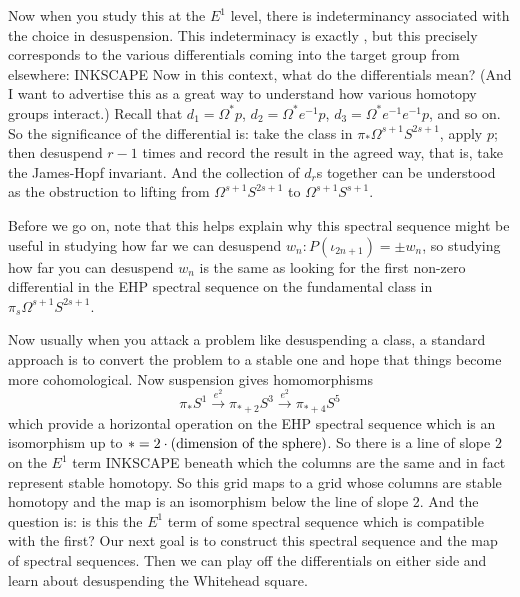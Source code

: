 \documentclass{article}
\newcommand{\BoxedNote}[1]{
\begin{center}\fbox{\begin{minipage}{.75\textwidth}
#1
\end{minipage}}
\end{center}
}
\newcommand{\Loops}{\Omega}
\begin{document}
Now when you study this at the $E^1$ level, there is indeterminancy associated with the choice in desuspension. This indeterminacy is exactly , but this precisely corresponds to the various differentials coming into the target group from elsewhere: INKSCAPE  Now in this context, what do the differentials mean?  (And I want to advertise this as a great way to understand how various homotopy groups interact.)  Recall that $d_1 = \Loops^* p$, $d_2 = \Loops^* e^{-1} p$, $d_3 = \Loops^* e^{-1} e^{-1} p$, and so on.  So the significance of the differential is: take the class in $\pi_* \Loops^{s+1} S^{2s+1}$, apply $p$; then desuspend $r-1$ times and record the result in the agreed way, that is, take the James-Hopf invariant.  And the collection of $d_r$s together can be understood as the obstruction to lifting from $\Loops^{s+1} S^{2s+1}$ to $\Loops^{s+1} S^{s+1}$.

Before we go on, note that this helps explain why this spectral sequence might be useful in studying how far we can desuspend $w_n: P(\iota_{2n+1}) = \pm w_n$, so studying how far you can desuspend $w_n$ is the same as looking for the first non-zero differential in the EHP spectral sequence on the fundamental class in $\pi_s \Loops^{s+1} S^{2s+1}$.

Now usually when you attack a problem like desuspending a class, a standard approach is to convert the problem to a stable one and hope that things become more cohomological.  Now suspension gives homomorphisms
\[
\pi_* S^1 \stackrel{e^2}{\to} \pi_{*+2} S^3 \stackrel{e^2}{\to} \pi_{*+4} S^5
\]
which provide a horizontal operation on the EHP spectral sequence which is an isomorphism up to $* = 2 \cdot (\hbox{dimension of the sphere})$.  So there is a line of slope $2$ on the $E^1$ term INKSCAPE beneath which the columns are the same and in fact represent stable homotopy.  So this grid maps to a grid whose columns are stable homotopy and the map is an isomorphism below the line of slope 2.  And the question is: is this the $E^1$ term of some spectral sequence which is compatible with the first?  Our next goal is to construct this spectral sequence and the map of spectral sequences.  Then we can play off the differentials on either side and learn about desuspending the Whitehead square.


\fi
\BoxedNote{}
\end{document}
